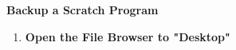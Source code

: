 \documentclass{article}
\begin{document}
	
	{\huge \textbf{Backup a Scratch Program}}
	
\begin{enumerate}
\item {\large \textbf{Open the File Browser to "Desktop"}}



\end{enumerate}
\end{document}
